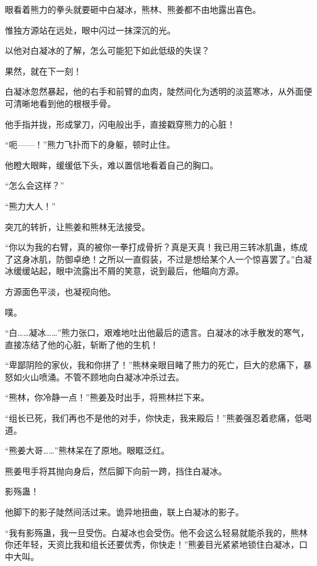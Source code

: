 
\begin{this_body}



眼看着熊力的拳头就要砸中白凝冰，熊林、熊姜都不由地露出喜色。

惟独方源站在远处，眼中闪过一抹深沉的光。

以他对白凝冰的了解，怎么可能犯下如此低级的失误？

果然，就在下一刻！

白凝冰忽然暴起，他的右手和前臂的血肉，陡然间化为透明的淡蓝寒冰，从外面便可清晰地看到他的根根手骨。

他手指并拢，形成掌刀，闪电般出手，直接戳穿熊力的心脏！

“呃——！”熊力飞扑而下的身躯，顿时止住。

他瞪大眼眸，缓缓低下头，难以置信地看着自己的胸口。

“怎么会这样？”

“熊力大人！”

突兀的转折，让熊姜和熊林无法接受。

“你以为我的右臂，真的被你一拳打成骨折？真是天真！我已用三转冰肌蛊，练成了这身冰肌，防御卓绝！之所以一直假装，不过是想给某个人一个惊喜罢了。”白凝冰缓缓站起，眼中流露出不屑的笑意，说到最后，他瞄向方源。

方源面色平淡，也凝视向他。

噗。

“白……凝冰……”熊力张口，艰难地吐出他最后的遗言。白凝冰的冰手散发的寒气，直接冻结了他的心脏，斩断了他的生机！

“卑鄙阴险的家伙，我和你拼了！”熊林亲眼目睹了熊力的死亡，巨大的悲痛下，暴怒如火山喷涌。不管不顾地向白凝冰冲杀过去。

“熊林，你冷静一点！”熊姜及时出手，将熊林拦下来。

“组长已死，我们再也不是他的对手，你快走，我来殿后！”熊姜强忍着悲痛，低喝道。

“熊姜大哥……”熊林呆在了原地。眼眶泛红。

熊姜甩手将其抛向身后，然后脚下向前一跨，挡住白凝冰。

影殇蛊！

他脚下的影子陡然间活过来。诡异地扭曲，联上白凝冰的影子。

“我有影殇蛊，我一旦受伤。白凝冰也会受伤。他不会这么轻易就能杀我的，熊林你还年轻，天资比我和组长还要优秀，你快走！”熊姜目光紧紧地锁住白凝冰，口中大叫。


\end{this_body}
